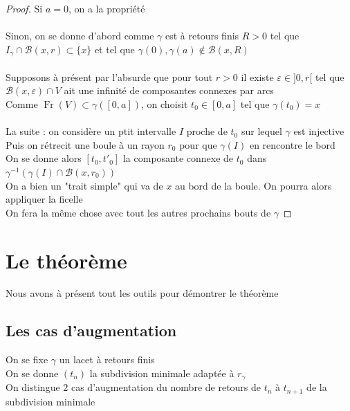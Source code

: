 \documentclass{article}
\begin{document}
\begin{flushleft}
\begin{proof}
    Si $a = 0$, on a la propriété
    \\~\\
    Sinon, on se donne d'abord comme $\gamma$ est à retours finis $R > 0$ tel que $I_{\gamma} \cap \mathcal{B}(x, r) \subset
    \{ x \}$ et tel que $\gamma(0), \gamma(a) \notin \mathcal{B}(x, R)$
    \\~\\
    Supposons à présent par l'absurde que pour tout $r > 0$ il existe $\varepsilon \in ]0, r[$ tel que
    $\mathcal{B}(x, \varepsilon) \cap V$ ait une infinité de composantes connexes par arcs\\
    Comme $\operatorname{Fr}(V) \subset \gamma([0, a])$, on choisit $t_0 \in [0, a]$ tel que $\gamma(t_0) = x$
    \\~\\
    La suite : on considère un ptit intervalle $I$ proche de $t_0$ sur lequel $\gamma$ est injective\\
    Puis on rétrecit une boule à un rayon $r_0$ pour que $\gamma(I)$ en rencontre le bord\\
    On se donne alors $[t_0, t'_0]$ la composante connexe de $t_0$ dans
    $\gamma^{-1}(\gamma(I) \cap \mathcal{B}(x, r_0))$\\
    On a bien un "trait simple" qui va de $x$ au bord de la boule. On pourra alors appliquer la ficelle\\
    On fera la même chose avec tout les autres prochains bouts de $\gamma$
\end{proof}

\section{Le théorème}

Nous avons à présent tout les outils pour démontrer le théorème

\subsection{Les cas d'augmentation}

On se fixe $\gamma$ un lacet à retours finis\\
On se donne $(t_n)$ la subdivision minimale adaptée à $r_{\gamma}$\\
On distingue 2 cas d'augmentation du nombre de retours de $t_n$ à $t_{n+1}$ de la subdivision minimale
\\~\\


\end{flushleft}
\end{document}

